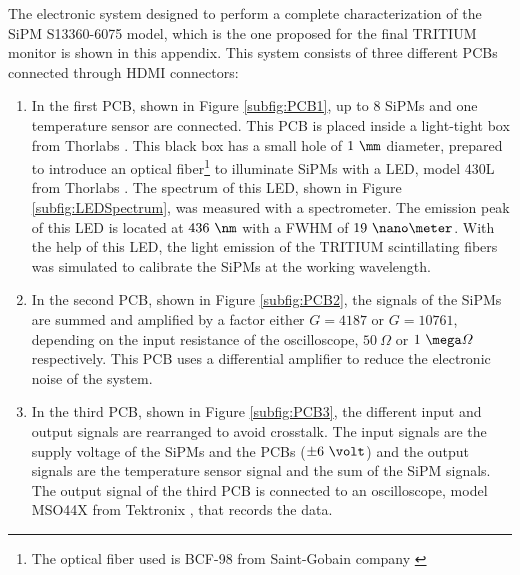 The electronic system designed to perform a complete characterization of the SiPM S13360-6075 model, which is the one proposed for the final TRITIUM monitor is shown in this appendix. This system consists of three different PCBs connected through HDMI connectors:

\begin{enumerate}
\item{} In the first PCB, shown in Figure \ref{subfig:PCB1}, up to 8 SiPMs and one temperature sensor are connected. This PCB is placed inside a light-tight box from Thorlabs \cite{ThorlabsCompany}. This black box has a small hole of $1~\mm$ diameter, prepared to introduce an optical fiber\footnote{The optical fiber used is BCF-98 from Saint-Gobain company \cite{OpticalFibers}} to illuminate SiPMs with a LED, model 430L from Thorlabs \cite{LEDThorlabs}. The spectrum of this LED, shown in Figure \ref{subfig:LEDSpectrum}, was measured with a spectrometer. The emission peak of this LED is located at $436~\nm$ with a FWHM of $19~\nano\meter$. With the help of this LED, the light emission of the TRITIUM scintillating fibers was simulated to calibrate the SiPMs at the working wavelength. 

\item{} In the second PCB, shown in Figure \ref{subfig:PCB2}, the signals of the SiPMs are summed and amplified by a factor either $G=4187$ or $G=10761$, depending on the input resistance of the oscilloscope, $50~\varOmega$ or $1~\mega\varOmega$ respectively. This PCB uses a differential amplifier to reduce the electronic noise of the system.

\item{} In the third PCB, shown in Figure \ref{subfig:PCB3}, the different input and output signals are rearranged to avoid crosstalk. The input signals are the supply voltage of the SiPMs and the PCBs ($\pm 6~\volt$) and the output signals are the temperature sensor signal and the sum of the SiPM signals. The output signal of the third PCB is connected to an oscilloscope, model MSO44X from Tektronix \cite{Oscilloscope}, that records the data.

\end{enumerate}

